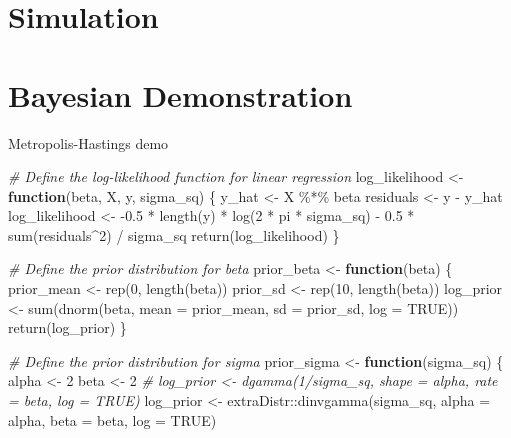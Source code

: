 \documentclass[
  letterpaper,
]{krantz}
\newenvironment{Shaded}{}{}
\newcommand{\AttributeTok}[1]{\textcolor[rgb]{0.49,0.56,0.16}{#1}}
\newcommand{\CommentTok}[1]{\textcolor[rgb]{0.38,0.63,0.69}{\textit{#1}}}
\newcommand{\ConstantTok}[1]{\textcolor[rgb]{0.53,0.00,0.00}{#1}}
\newcommand{\ControlFlowTok}[1]{\textcolor[rgb]{0.00,0.44,0.13}{\textbf{#1}}}
\newcommand{\DecValTok}[1]{\textcolor[rgb]{0.25,0.63,0.44}{#1}}
\newcommand{\FloatTok}[1]{\textcolor[rgb]{0.25,0.63,0.44}{#1}}
\newcommand{\FunctionTok}[1]{\textcolor[rgb]{0.02,0.16,0.49}{#1}}
\newcommand{\NormalTok}[1]{#1}
\newcommand{\OtherTok}[1]{\textcolor[rgb]{0.00,0.44,0.13}{#1}}
\newcommand{\SpecialCharTok}[1]{\textcolor[rgb]{0.25,0.44,0.63}{#1}}
\begin{document}
\section{Simulation}\label{simulation}

\section{Bayesian Demonstration}\label{bayesian-demonstration}

Metropolis-Hastings demo

\begin{Shaded}
\begin{Highlighting}[]
\CommentTok{\# Define the log{-}likelihood function for linear regression}
\NormalTok{log\_likelihood }\OtherTok{\textless{}{-}} \ControlFlowTok{function}\NormalTok{(beta, X, y, sigma\_sq) \{}
\NormalTok{    y\_hat }\OtherTok{\textless{}{-}}\NormalTok{ X }\SpecialCharTok{\%*\%}\NormalTok{ beta}
\NormalTok{    residuals }\OtherTok{\textless{}{-}}\NormalTok{ y }\SpecialCharTok{{-}}\NormalTok{ y\_hat}
\NormalTok{    log\_likelihood }\OtherTok{\textless{}{-}} \SpecialCharTok{{-}}\FloatTok{0.5} \SpecialCharTok{*} \FunctionTok{length}\NormalTok{(y) }\SpecialCharTok{*} \FunctionTok{log}\NormalTok{(}\DecValTok{2} \SpecialCharTok{*}\NormalTok{ pi }\SpecialCharTok{*}\NormalTok{ sigma\_sq) }\SpecialCharTok{{-}} \FloatTok{0.5} \SpecialCharTok{*} \FunctionTok{sum}\NormalTok{(residuals}\SpecialCharTok{\^{}}\DecValTok{2}\NormalTok{) }\SpecialCharTok{/}\NormalTok{ sigma\_sq}
    \FunctionTok{return}\NormalTok{(log\_likelihood)}
\NormalTok{\}}

\CommentTok{\# Define the prior distribution for beta}
\NormalTok{prior\_beta }\OtherTok{\textless{}{-}} \ControlFlowTok{function}\NormalTok{(beta) \{}
\NormalTok{    prior\_mean }\OtherTok{\textless{}{-}} \FunctionTok{rep}\NormalTok{(}\DecValTok{0}\NormalTok{, }\FunctionTok{length}\NormalTok{(beta))}
\NormalTok{    prior\_sd }\OtherTok{\textless{}{-}} \FunctionTok{rep}\NormalTok{(}\DecValTok{10}\NormalTok{, }\FunctionTok{length}\NormalTok{(beta))}
\NormalTok{    log\_prior }\OtherTok{\textless{}{-}} \FunctionTok{sum}\NormalTok{(}\FunctionTok{dnorm}\NormalTok{(beta, }\AttributeTok{mean =}\NormalTok{ prior\_mean, }\AttributeTok{sd =}\NormalTok{ prior\_sd, }\AttributeTok{log =} \ConstantTok{TRUE}\NormalTok{))}
    \FunctionTok{return}\NormalTok{(log\_prior)}
\NormalTok{\}}

\CommentTok{\# Define the prior distribution for sigma}
\NormalTok{prior\_sigma }\OtherTok{\textless{}{-}} \ControlFlowTok{function}\NormalTok{(sigma\_sq) \{}
\NormalTok{    alpha }\OtherTok{\textless{}{-}} \DecValTok{2}
\NormalTok{    beta }\OtherTok{\textless{}{-}} \DecValTok{2}
    \CommentTok{\# log\_prior \textless{}{-} dgamma(1/sigma\_sq, shape = alpha, rate = beta, log = TRUE)}
\NormalTok{    log\_prior }\OtherTok{\textless{}{-}}\NormalTok{ extraDistr}\SpecialCharTok{::}\FunctionTok{dinvgamma}\NormalTok{(sigma\_sq, }\AttributeTok{alpha =}\NormalTok{ alpha, }\AttributeTok{beta =}\NormalTok{ beta, }\AttributeTok{log =} \ConstantTok{TRUE}\NormalTok{) }


\end{Highlighting}
\end{Shaded}
\end{document}
